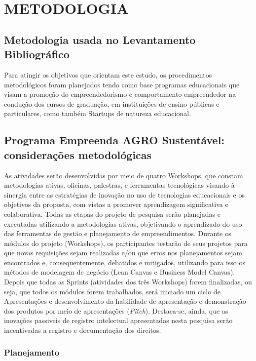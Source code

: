 \chapter{METODOLOGIA}

\section{Metodologia usada no Levantamento Bibliográfico}

Para atingir os objetivos que orientam este estudo, os procedimentos metodológicos foram planejados tendo como base programas educacionais que visam a promoção do empreendedorismo e comportamento empreendedor na condução dos cursos de graduação, em instituições de ensino públicas e particulares, como também Startups de natureza educacional.


\section{Programa Empreenda AGRO Sustentável: considerações metodológicas}


As atividades serão desenvolvidas por meio de quatro Workshops, que constam metodologias ativas, oficinas, palestras, e ferramentas tecnológicas visando à sinergia entre as estratégias de inovação no uso de tecnologias educacionais e os objetivos da proposta, com vistas a promover aprendizagem significativa e colaborativa. Todas as etapas do projeto de pesquisa serão planejadas e executadas utilizando a metodologias ativas, objetivando o aprendizado do uso das ferramentas de gestão e planejamento de empreendimentos.
Durante os módulos do projeto (Workshops), os participantes testarão de seus projetos para que novas requisições sejam realizadas e/ou que erros nos planejamentos sejam encontrados e, consequentemente, debatidos e mitigados, utilizando para isso os métodos de modelagem de negócio (Lean Canvas e Business Model Canvas). Depois que todas as Sprints (atividades dos três Workshops) forem finalizadas, ou seja, que todos os módulos forem trabalhados, será iniciado um ciclo de Apresentações e desenvolvimento da habilidade de apresentação e demonstração dos produtos por meio de apresentações (\textit{Pitch}). Destaca-se, ainda, que as inovações passiveis de registro intelectual apresentadas nesta pesquisa serão incentivadas a registro e documentação dos direitos.


\newpage
\subsection{Planejamento}


